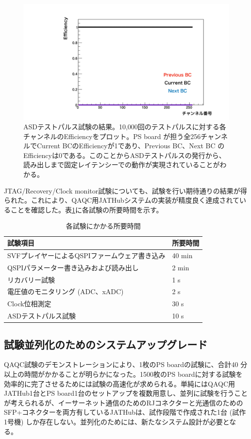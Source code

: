 \begin{figure} 
\centering
\includegraphics[width=16cm]{fig/QAQC/QAQCresult.pdf}
\caption[ASDテストパルスの結果]{ASDテストパルス試験の結果。10,000回のテストパルスに対する各チャンネルのEfficiencyをプロット。PS board が担う全256チャンネルでCurrent BCのEfficiencyが1であり、Previous BC、Next BC のEfficiencyは0である。このことからASDテストパルスの発行から、読み出しまで固定レイテンシーでの動作が実現されていることがわかる。}
\label{QAQCresult}
\end{figure}

JTAG/Recovery/Clock monitor試験についても、試験を行い期待通りの結果が得られた。これにより、QAQC用JATHubシステムの実装が精度良く達成されていることを確認した。表\ref{table_testtime}に各試験の所要時間を示す。

\begin{table}[]
    \centering
    \caption{各試験にかかる所要時間}
    \label{table_testtime}    
    \begin{tabular}{ll}
    \hline
    試験項目                          & 所要時間   \\ \hline
    SVFプレイヤーによるQSPIファームウェア書き込み    & 40 min \\
    QSPIパラメーター書き込みおよび読み出し         & 2 min  \\
    リカバリー試験                       & 1 s    \\
    電圧値のモニタリング (ADC、xADC) & 2 s    \\
    Clock位相測定                     & 30 s   \\
    ASDテストパルス試験                   & 10 s  
    \end{tabular}
\end{table}

\subsection{試験並列化のためのシステムアップグレード}
\label{subsec_parallel}
QAQC試験のデモンストレーションにより、1枚のPS boardの試験に、合計40 分以上の時間がかかることが明らかになった。1500枚のPS boardに対する試験を効率的に完了させるためには試験の高速化が求められる。単純にはQAQC用JATHub1台とPS board1台のセットアップを複数用意し、並列に試験を行うことが考えられるが、イーサーネット通信のためのRJコネクターと光通信のためのSFP+コネクターを両方有しているJATHubは、試作段階で作成された1台 (試作1号機) しか存在しない。並列化のためには、新たなシステム設計が必要となる。

